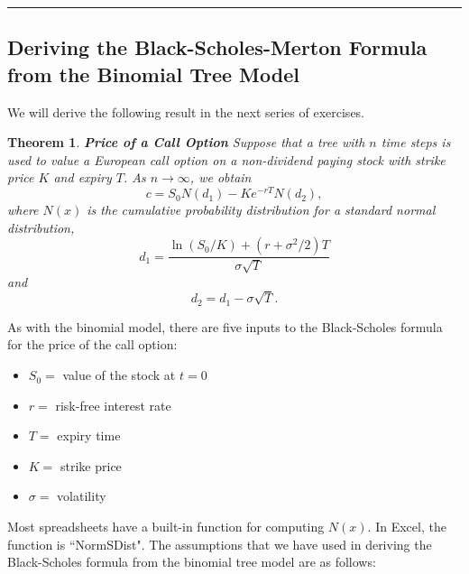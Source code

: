 \documentclass[letterpaper,10pt]{article}
\newtheorem{thm}{Theorem}
\begin{document}
\bigskip

\hrule

\bigskip

\subsection{Deriving the Black-Scholes-Merton Formula from the Binomial Tree Model}

\noindent We will derive the following result in the next series of exercises.

\begin{thm}{\bf Price of a Call Option} Suppose that a tree with $n$ time steps is used to value a European call option on a non-dividend paying stock with strike price $K$ and expiry $T$.  As $n\rightarrow\infty$, we obtain $$c=S_0N(d_1)-Ke^{-rT}N(d_2),$$ where $N(x)$ is the cumulative probability distribution for a standard normal distribution, $$d_1=\frac{\ln(S_0/K)+(r+\sigma^2/2)T}{\sigma\sqrt{T}}$$ and $$d_2=d_1-\sigma\sqrt{T}.$$  
\end{thm}

\noindent As with the binomial model, there are five inputs to the Black-Scholes formula for the price of the call option:

\begin{multicols}{3}
\begin{itemize}
\item $S_0=$ value of the stock at $t=0$
\item $r=$ risk-free interest rate
\item $T=$ expiry time
\item $K=$ strike price
\item $\sigma=$ volatility
\end{itemize}
\end{multicols}

\noindent Most spreadsheets have a built-in function for computing $N(x)$. In Excel, the function is ``NormSDist".  The assumptions that we have used in deriving the Black-Scholes formula from the binomial tree model are as follows:
\end{document}
